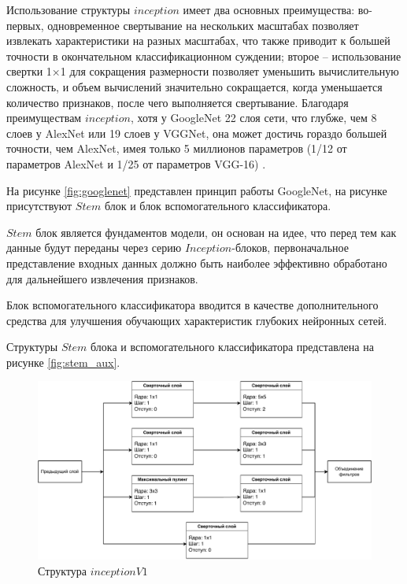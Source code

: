 Использование структуры $inception$ имеет два основных преимущества: во-первых, одновременное свертывание на нескольких масштабах позволяет извлекать характеристики на разных масштабах, что также приводит к большей точности в окончательном классификационном суждении; второе – использование свертки 1×1 для сокращения размерности позволяет уменьшить вычислительную сложность, и объем вычислений значительно сокращается, когда уменьшается количество признаков, после чего выполняется свертывание. Благодаря преимуществам $inception$, хотя у GoogleNet 22 слоя сети, что глубже, чем 8 слоев у AlexNet или 19 слоев у VGGNet, она может достичь гораздо большей точности, чем AlexNet, имея только 5 миллионов параметров (1/12 от параметров AlexNet и 1/25 от параметров VGG-16) \cite{googlenet}.

На рисунке \ref{fig:googlenet} представлен принцип работы GoogleNet, на рисунке присутствуют $Stem$ блок и блок вспомогательного классификатора.

$Stem$ блок является фундаментов модели, он основан на идее, что перед тем как данные будут переданы через серию  $Inception$-блоков, первоначальное представление входных данных должно быть наиболее эффективно обработано для дальнейшего извлечения признаков. 

Блок вспомогательного классификатора вводится в качестве дополнительного средства для улучшения обучающих характеристик глубоких нейронных сетей.

Структуры $Stem$ блока и вспомогательного классификатора представлена на рисунке \ref{fig:stem_aux}.

\begin{figure}[hbtp]
	\centering
	\includegraphics[width=\textwidth]{img/inception.pdf}
	\caption{Структура $inceptionV1$}
	\label{fig:inception}
\end{figure}

